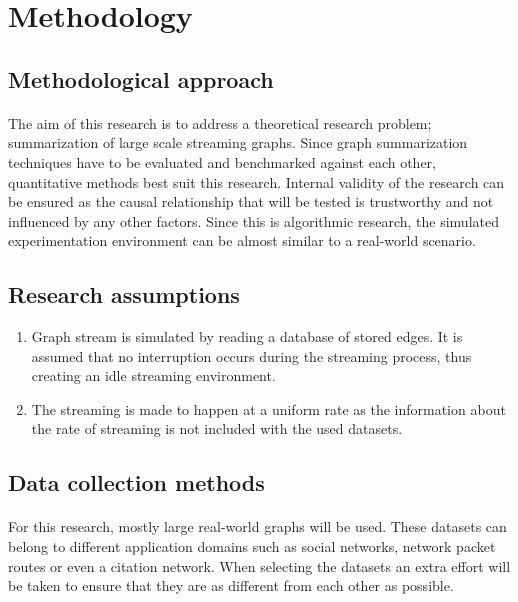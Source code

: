\section{Methodology}

\subsection{Methodological approach}

\paragraph{}
The aim of this research is to address a theoretical research problem; summarization of large scale streaming graphs. Since graph summarization techniques have to be evaluated and benchmarked against each other, quantitative methods best suit this research. Internal validity of the research can be ensured as the causal relationship that will be tested is trustworthy and not influenced by any other factors. Since this is algorithmic research, the simulated experimentation environment can be almost similar to a real-world scenario.

\subsection{Research assumptions}

\begin{enumerate}
    \item Graph stream is simulated by reading a database of stored edges. It is assumed that no interruption occurs during the streaming process, thus creating an idle streaming environment.
    \item The streaming is made to happen at a uniform rate as the information about the rate of streaming is not included with the used datasets.
\end{enumerate}

\subsection{Data collection methods}

\paragraph{}
For this research, mostly large real-world graphs will be used. These datasets can belong to different application domains such as social networks, network packet routes or even a citation network. When selecting the datasets an extra effort will be taken to ensure that they are as different from each other as possible.

